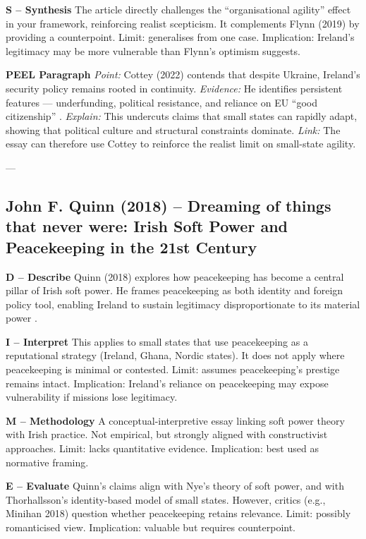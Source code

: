 \textbf{S – Synthesis}  
The article directly challenges the “organisational agility” effect in your framework, reinforcing realist scepticism. It complements Flynn (2019) by providing a counterpoint. Limit: generalises from one case. Implication: Ireland’s legitimacy may be more vulnerable than Flynn’s optimism suggests.

\textbf{PEEL Paragraph}  
\textit{Point:} Cottey (2022) contends that despite Ukraine, Ireland’s security policy remains rooted in continuity.  
\textit{Evidence:} He identifies persistent features — underfunding, political resistance, and reliance on EU “good citizenship” \parencite{COTTEY_2022}.  
\textit{Explain:} This undercuts claims that small states can rapidly adapt, showing that political culture and structural constraints dominate.  
\textit{Link:} The essay can therefore use Cottey to reinforce the realist limit on small-state agility.  

---

\subsection*{John F. Quinn (2018) – Dreaming of things that never were: Irish Soft Power and Peacekeeping in the 21st Century}

\textbf{D – Describe}  
Quinn (2018) explores how peacekeeping has become a central pillar of Irish soft power. He frames peacekeeping as both identity and foreign policy tool, enabling Ireland to sustain legitimacy disproportionate to its material power \parencite{QUINN_2018}.

\textbf{I – Interpret}  
This applies to small states that use peacekeeping as a reputational strategy (Ireland, Ghana, Nordic states). It does not apply where peacekeeping is minimal or contested. Limit: assumes peacekeeping’s prestige remains intact. Implication: Ireland’s reliance on peacekeeping may expose vulnerability if missions lose legitimacy.

\textbf{M – Methodology}  
A conceptual-interpretive essay linking soft power theory with Irish practice. Not empirical, but strongly aligned with constructivist approaches. Limit: lacks quantitative evidence. Implication: best used as normative framing.

\textbf{E – Evaluate}  
Quinn’s claims align with Nye’s theory of soft power, and with Thorhallsson’s identity-based model of small states. However, critics (e.g., Minihan 2018) question whether peacekeeping retains relevance. Limit: possibly romanticised view. Implication: valuable but requires counterpoint.

